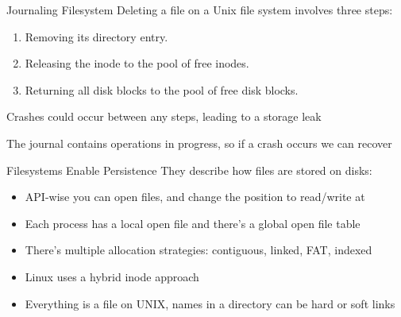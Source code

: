   \begin{frame}{Journaling Filesystem}
    Deleting a file on a Unix file system involves three steps:

    \begin{enumerate}
      \item Removing its directory entry.
      \item Releasing the inode to the pool of free inodes.
      \item Returning all disk blocks to the pool of free disk blocks.
    \end{enumerate}

    \vspace{2em}

    Crashes could occur between any steps, leading to a storage leak

    \vspace{2em}

    The journal contains operations in progress, so if a crash occurs we can recover
  \end{frame}


  \begin{frame}{Filesystems Enable Persistence}
    They describe how files are stored on disks:
    \begin{itemize}
      \item API-wise you can open files, and change the position to read/write
            at
      \item Each process has a local open file and there's a global open file
            table
      \item There's multiple allocation strategies: contiguous, linked, FAT, indexed
      \item Linux uses a hybrid inode approach
      \item Everything is a file on UNIX, names in a directory can be hard or soft links
      
    \end{itemize}
  \end{frame}

